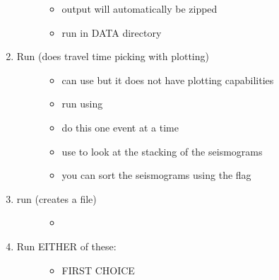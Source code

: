 \documentclass[letterpaper,10pt,english]{sphinxmanual}
\begin{document}
\begin{enumerate}
\begin{description}
\begin{itemize}
\item {} 
output will automatically be zipped

\item {} 
run in DATA directory

\end{itemize}

\end{description}

\item {} \begin{description}
\item[{Run  (does travel time picking with plotting)}] \leavevmode\begin{itemize}
\item {} 
can use  but it does not have plotting capabilities

\item {} 
run using 

\item {} 
do this one event at a time

\item {} 
use  to look at the stacking of the seismograms

\item {} 
you can sort the seismograms using the  flag

\end{itemize}

\end{description}

\item {} \begin{description}
\item[{run  (creates a  file)}] \leavevmode\begin{itemize}
\item {} 

\end{itemize}

\end{description}

\item {} \begin{description}
\item[{Run EITHER of these:}] \leavevmode\begin{itemize}
\item {} 
FIRST CHOICE


\end{itemize}
\end{description}
\end{enumerate}
\end{document}
